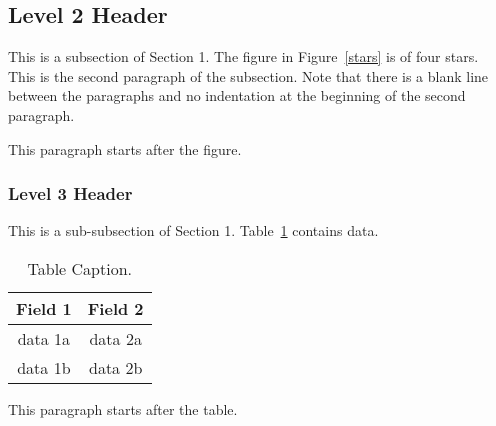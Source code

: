 \documentclass[12pt]{article}
\begin{document}
\subsection{Level 2 Header}

This is a subsection of Section 1.   The figure in Figure~\ref{stars} is of four stars.\\

This is the second paragraph of the subsection.  Note that there is a blank line between the paragraphs and
no indentation at the beginning of the second paragraph. 
 

This paragraph starts after the figure.

\subsubsection{Level 3 Header}

This is a sub-subsection of Section 1.  Table~\ref{table1} contains data.

\begin{table}[hbt]
\begin{center}
\begin{tabular}{|c|c|} \hline
Field 1 & Field 2\\ \hline
data 1a   & data 2a\\ \hline
data 1b &  data 2b \\ \hline
\end{tabular}
\end{center}
\caption{Table Caption.}
\label{table1} 
\end{table}

This paragraph starts after the table.
 


\end{document}
